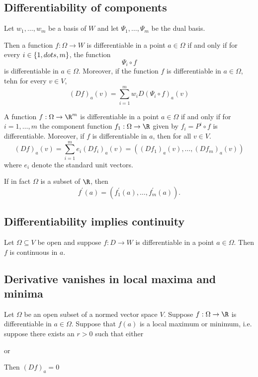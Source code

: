 \subsection{Differentiability of components}
\begin{proposition}
    Let $w_1, \dots, w_m$ be a basis of $W$ and let $\Psi_1,\dots,\Psi_m$ be the dual basis.

    Then a function $f: \Omega \to W$ is differentiable in a point $a \in \Omega$ if and
    only if for every $i \in \{1, \\dots, m\}$, the function
    $$\Psi_i \circ f$$
    is differentiable in $a \in \Omega$. Moreover, if the function $f$ is differentiable
    in $a \in \Omega$, tehn for every $v \in V$, 
    $$(Df)_a(v) = \sum_{i=1}^mw_iD(\Psi_i \circ f)_a(v)$$
\end{proposition}

\begin{corollary}
    A function $f: \Omega \to \R^m$ is differentiable in a point $a \in \Omega$ if and only
    if for $i = 1,\dots, m$ the component function $f_1:\Omega \to \R$ given by $f_i = P^i\circ f$
    is differentiable. Moreover, if $f$ is differentiable in $a$, then for all $v \in V$.
    $$(Df)_a(v) = \sum_{i=1}^me_i(Df_i)_a(v) = ((Df_1)_a(v), \dots, (Df_m)_a(v))$$
    where $e_i$ denote the standard unit vectors.

    If in fact $\Omega$ is a subset of $\R$, then
    $$f^\prime(a) = (f_1^\prime(a),\dots,f_m^\prime(a)).$$
\end{corollary}

\subsection{Differentiability implies continuity}
\begin{theorem}
    Let $\Omega \subseteq V$ be open and suppose $f: D \to W$ is differentiable in a point $a \in \Omega$.
    Then $f$ is continuous in $a$.
\end{theorem}

\subsection{Derivative vanishes in local maxima and minima}

\begin{theorem}
    Let $\Omega$ be an open subset of a normed vector space $V$. Suppose $f: \Omega \to \R$ is differentiable
    in $a \in \Omega$. Suppose that $f(a)$ is a local maximum or minimum, i.e. suppose there exists an $r > 0$
    such that either
    \begin{myCenter}
    \end{myCenter}
    or 
    \begin{myCenter}
    \end{myCenter}
    Then $(Df)_a = 0$
\end{theorem}

